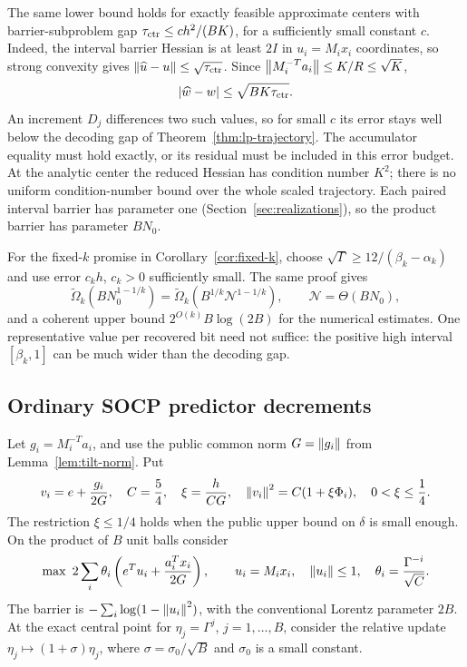 The same lower bound holds for exactly feasible approximate centers with
barrier-subproblem gap $\tau_{\rm ctr}\leq c h^2/(BK)$, for a
sufficiently small constant $c$.  Indeed, the interval barrier Hessian is at least $2I$ in
$u_i=M_ix_i$ coordinates, so strong convexity gives
$\left\lVert\widehat u-u\right\rVert\leq\sqrt{\tau_{\rm ctr}}$.  Since
$\left\lVert M_i^{-T}a_i\right\rVert\leq K/R\leq\sqrt K$,
\[
 |\widehat w-w|\leq\sqrt{BK\tau_{\rm ctr}}.
\]
An increment $D_j$ differences two such values, so for small $c$ its
error stays well below the decoding gap of
Theorem~\ref{thm:lp-trajectory}.  The accumulator equality must hold
exactly, or its residual must be included in this error budget.  At the
analytic center the reduced Hessian has condition number $K^2$; there is
no uniform condition-number bound over the whole scaled trajectory.  Each
paired interval barrier has parameter one
(Section~\ref{sec:realizations}), so the product barrier has parameter
$BN_0$.

For the fixed-$k$ promise in Corollary~\ref{cor:fixed-k}, choose
$\sqrt\Gamma\geq12/(\beta_k-\alpha_k)$ and use error
$c_kh$, $c_k>0$ sufficiently small.  The same proof gives
\[
 \widetilde\Omega_k(BN_0^{1-1/k})
 =\widetilde\Omega_k(B^{1/k}\mathcal N^{1-1/k}),
 \qquad\mathcal N=\Theta(BN_0),
\]
and a coherent upper bound $2^{O(k)}B\log(2B)$ for the numerical
estimates.  One representative value per recovered bit need not suffice:
the positive high interval $[\beta_k,1]$ can be much wider than the
decoding gap.

\subsection{Ordinary SOCP predictor decrements}
Let $g_i=M_i^{-T}a_i$, and use the public common norm
$G=\left\lVert g_i\right\rVert$ from Lemma~\ref{lem:tilt-norm}.  Put
\[
 v_i=e+\frac{g_i}{2G},\quad C=\frac54,\quad
 \xi=\frac{h}{CG},\quad\left\lVert v_i\right\rVert^2=C(1+\xi\Phi_i),
 \quad 0<\xi\leq\frac14.
\]
The restriction $\xi\leq1/4$ holds when the public upper bound on
$\delta$ is small enough.  On the product of $B$ unit balls consider
\begin{equation}\label{eq:multiplex-socp}
 \max\ 2\sum_i\theta_i\left(e^Tu_i+\frac{a_i^Tx_i}{2G}\right),
 \qquad u_i=M_ix_i,\quad\left\lVert u_i\right\rVert\leq1,
 \quad\theta_i=\frac{\Gamma^{-i}}{\sqrt C}.
\end{equation}
The barrier is $-\sum_i\log(1-\left\lVert u_i\right\rVert^2)$, with the conventional
Lorentz parameter $2B$.  At the exact central point for
$\eta_j=\Gamma^j$, $j=1,\ldots,B$, consider the relative update
$\eta_j\mapsto(1+\sigma)\eta_j$, where
$\sigma=\sigma_0/\sqrt B$ and $\sigma_0$ is a small constant.

